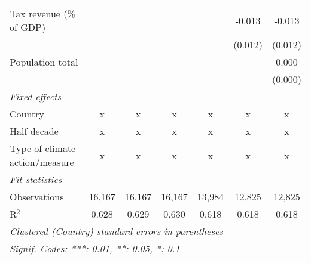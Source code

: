 \begin{tabular}{lcccccc}
   Tax revenue (\% of GDP)                   &              &         &               &              & -0.013        & -0.013\\   
                                             &              &         &               &              & (0.012)       & (0.012)\\   
   Population total                          &              &         &               &              &               & 0.000\\   
                                             &              &         &               &              &               & (0.000)\\   
   \emph{Fixed effects}\\
   Country                                   & x            & x       & x             & x            & x             & x\\  
   Half decade                               & x            & x       & x             & x            & x             & x\\  
   Type of climate action/measure            & x            & x       & x             & x            & x             & x\\  
   \midrule \emph{Fit statistics}\\
   Observations                              & 16,167       & 16,167  & 16,167        & 13,984       & 12,825        & 12,825\\  
   R$^2$                                     & 0.628        & 0.629   & 0.630         & 0.618        & 0.618         & 0.618\\  
   \midrule
   \multicolumn{7}{l}{\emph{Clustered (Country) standard-errors in parentheses}}\\
   \multicolumn{7}{l}{\emph{Signif. Codes: ***: 0.01, **: 0.05, *: 0.1}}\\
\end{tabular}
\par\endgroup


